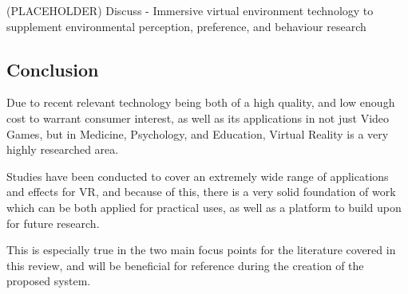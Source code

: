 \begin{multicols*}{2}
		
		
		(PLACEHOLDER) Discuss \cite{smith2015} - Immersive virtual environment technology to supplement environmental perception, preference, and behaviour research
		
	\subsection{Conclusion}
	\label{lr:vr:conclusion}
		Due to recent relevant technology being both of a high quality, and low enough cost to warrant consumer interest, as well as its applications in not just Video Games, but in Medicine, Psychology, and Education, Virtual Reality is a very highly researched area.
		
		Studies have been conducted to cover an extremely wide range of applications and effects for VR, and because of this, there is a very solid foundation of work which can be both applied for practical uses, as well as a platform to build upon for future research.
		
		This is especially true in the two main focus points for the literature covered in this review, and will be beneficial for reference during the creation of the proposed system.
	
\end{multicols*}